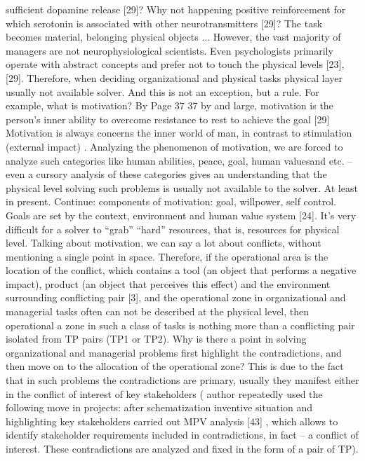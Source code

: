 sufficient dopamine release [29]? Why not happening
positive reinforcement for which serotonin is associated with other
neurotransmitters [29]? The task becomes material, belonging
physical objects ...
However, the vast majority of managers are not neurophysiological scientists.
Even psychologists primarily operate with abstract concepts and
prefer not to touch the physical levels [23], [29]. Therefore, when deciding
organizational and physical tasks physical layer usually not available
solver. And this is not an exception, but a rule. For example, what is motivation? By
Page 37
37
by and large, motivation is the person’s inner ability to overcome
resistance to rest to achieve the goal [29] Motivation is always
concerns the inner world of man, in contrast to stimulation (external
impact) . Analyzing the phenomenon of motivation, we are forced to analyze such
categories like human abilities, peace, goal, human values ​​and
etc. -- even a cursory analysis of these categories gives an understanding that the physical level
solving such problems is usually not available to the solver. At least in
present. Continue: components of motivation: goal, willpower,
self control. Goals are set by the context, environment and human value system
[24]. It’s very difficult for a solver to “grab” “hard” resources, that is, resources for
physical level. Talking about motivation, we can say a lot about conflicts,
without mentioning a single point in space.
Therefore, if the operational area is the location of the conflict,
which contains a tool (an object that performs a negative impact),
product (an object that perceives this effect) and the environment surrounding
conflicting pair [3], and the operational zone in organizational and managerial
tasks often can not be described at the physical level, then operational
a zone in such a class of tasks is nothing more than a conflicting pair isolated from
TP pairs (TP1 or TP2).
Why is there a point in solving organizational and managerial problems
first highlight the contradictions, and then move on to the allocation of the operational zone?
This is due to the fact that in such problems the contradictions are primary, usually they
manifest either in the conflict of interest of key stakeholders ( author
repeatedly used the following move in projects: after schematization
inventive situation and highlighting key stakeholders carried out
MPV analysis [43] , which allows to identify stakeholder requirements included in
contradictions, in fact -- a conflict of interest. These contradictions are analyzed and
fixed in the form of a pair of TP).
